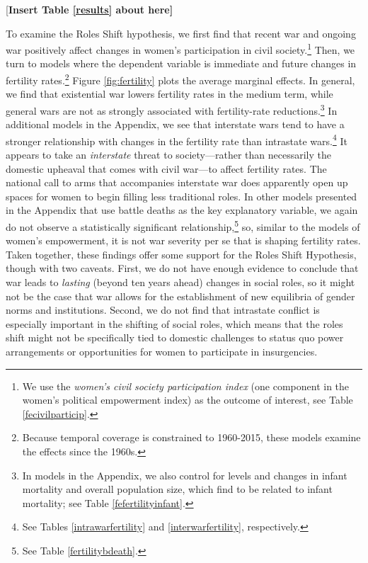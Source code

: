 \documentclass [12pt] {article}
\begin{document}
\begin{center}
[\bf Insert Table \ref{results} about here]
\end{center}
\vspace*{.2in}

To examine the Roles Shift hypothesis, we first find that recent war and ongoing war positively affect changes in women's participation in civil society.\footnote{We use the \emph{women's civil society participation index} (one component in the women's political empowerment index) as the outcome of interest, see Table \ref{fecivilparticip}.} Then, we turn to models where the dependent variable is immediate and future changes in fertility rates.\footnote{Because temporal coverage is constrained to 1960-2015, these models examine the effects since the 1960s.} Figure \ref{fig:fertility} plots the average marginal effects.  In general, we find that existential war lowers fertility rates in the medium term, while general wars are not as strongly associated with fertility-rate reductions.\footnote{In models in the Appendix, we also control for levels and changes in infant mortality and overall population size, which  find to be related to infant mortality; see Table \ref{fefertilityinfant}.} In additional models in the Appendix, we see that interstate wars tend to have a stronger relationship with changes in the fertility rate than intrastate wars.\footnote{See %
Tables \ref{intrawarfertility} and \ref{interwarfertility}, respectively.} It appears to take an \emph{interstate} threat to society---rather than necessarily the domestic upheaval that comes with civil war---to affect fertility rates. The national call to arms that accompanies interstate war does apparently open up spaces for women to begin filling less traditional roles. In other models presented in the Appendix that use battle deaths as the key explanatory variable, we again do not observe a statistically significant relationship,\footnote{See Table \ref{fertilitybdeath}.} so, similar to the models of women's empowerment, it is not war severity per se that is shaping fertility rates. Taken together, these findings offer some support for the Roles Shift Hypothesis, though with two caveats. First, we do not have enough evidence to conclude that war leads to \emph{lasting} (beyond ten years ahead) changes in social roles, so it might not be the case that war allows for the establishment of new equilibria of gender norms and institutions. Second, we do not find that intrastate conflict is especially important in the shifting of social roles, which means that the roles shift might not be specifically tied to domestic challenges to status quo power arrangements or opportunities for women to participate in insurgencies. \\
\end{document}
